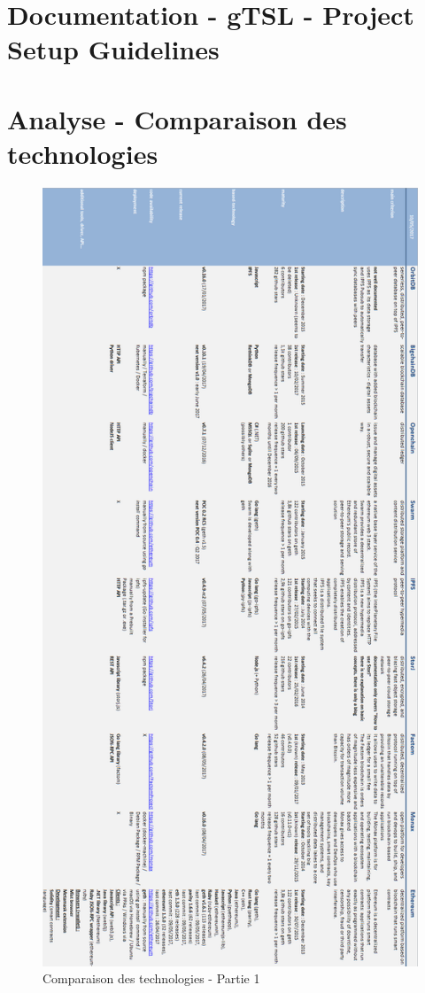 \documentclass{tnreport}
\begin{document}
\chapter{Documentation - gTSL - Project Setup Guidelines}
\label{anx:gtsl-guidelines}

\clearpage

\chapter{Analyse - Comparaison des technologies}
\label{anx:comparison}

\begin{figure}[h]
	\centering
	\includegraphics[scale=0.5]{figures/blockchain-technologies-comparison-part1}
	\caption{Comparaison des technologies - Partie 1}
	\label{fig:comparison-part1}
\end{figure}
\end{document}
